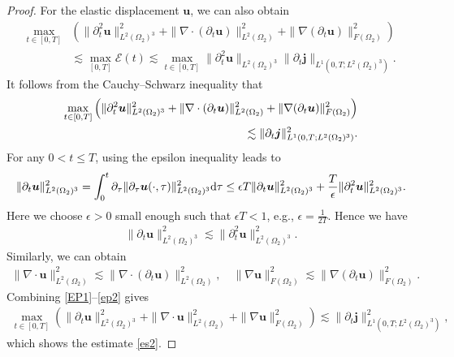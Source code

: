 \documentclass[final,leqno]{siamltex}
\begin{document}
\begin{proof}
For the elastic displacement $\boldsymbol u$, we can also obtain
\begin{align*}
 \max \limits_{ t \in [0, T]}
 &\left(  \| \partial_t^2 \boldsymbol u\|^2_{L^2 (\Omega_2)^3} +\| \nabla \cdot
(\partial_t \boldsymbol u)\|^2_{L^2 (\Omega_2)}
 +\| \nabla (\partial_t \boldsymbol u)\|^2_{F (\Omega_2)} \right)\\
& \lesssim \max
\limits_{[0, T]} \mathscr E (t)\lesssim  \max \limits_{t \in [0, T]}
\|\partial_t^2  {\boldsymbol u}\|_{L^2
(\Omega_2)^3} \|\partial_t \boldsymbol j \|_{ L^1 (0, T; L^2 (\Omega_2)^3)}.
\end{align*}
It follows from the Cauchy--Schwarz inequality that
\begin{align}\label{EP1}
 \max \limits_{ t \in [0, T]}
 \left(  \| \partial_t^2 \boldsymbol u\|^2_{L^2 (\Omega_2)^3} +\| \nabla \cdot
(\partial_t \boldsymbol u)\|^2_{L^2 (\Omega_2)}
 +\| \nabla (\partial_t \boldsymbol u)\|^2_{F (\Omega_2)} \right)\notag\\
 \lesssim\|\partial_t \boldsymbol j\|^2_{L^1 (0, T; L^2 (\Omega_2)^3)}.
\end{align}
For any $0 <t \leq T$, using the epsilon inequality leads to
\begin{align*}
 \|\partial_t \boldsymbol u\|^2_{L^2 (\Omega_2)^3} = \int_0^t \partial_\tau
\|\partial_\tau \boldsymbol u (\cdot, \tau)\|^2_{L^2 (\Omega_2)^3}  {\rm d} \tau
  \leq \epsilon T  \|\partial_t \boldsymbol u\|^2_{L^2 (\Omega_2)^3} +
\frac{T}{\epsilon} \| \partial_t^2 \boldsymbol u\|^2_{L^2 (\Omega_2)^3}.
\end{align*}
Here we choose $\epsilon>0 $ small enough  such that  $ \epsilon T <1$,
e.g., $\epsilon =\frac{1}{2T}$. Hence we have
\begin{align}\label{ep1}
 \|\partial_t \boldsymbol u\|^2_{L^2 (\Omega_2)^3} \lesssim \| \partial_t^2
\boldsymbol u\|^2_{L^2 (\Omega_2)^3}.
\end{align}
Similarly, we can  obtain
\begin{align}\label{ep2}
 \|\nabla \cdot \boldsymbol u\|^2_{L^2 (\Omega_2)} \lesssim  \| \nabla \cdot
(\partial_t \boldsymbol u)\|^2_{L^2 (\Omega_2)}, \quad
 \|\nabla \boldsymbol u\|^2_{F(\Omega_2)} \lesssim \| \nabla (\partial_t
\boldsymbol u)\|^2_{F (\Omega_2)}.
\end{align}
Combining \eqref{EP1}--\eqref{ep2} gives
\begin{align*}
 \max \limits_{t\in [0, T]} \left( \|\partial_t \boldsymbol u\|^2_{L^2
(\Omega_2)^3} +\|\nabla \cdot \boldsymbol u\|^2_{L^2 (\Omega_2)} +  \|\nabla
\boldsymbol u\|^2_{F(\Omega_2)}\right) 
\lesssim\|\partial_t\boldsymbol j\|^2_{L^1(0,T;L^2(\Omega_2)^3)},
\end{align*}
which shows the estimate \eqref{es2}.
\end{proof}
\end{document}
